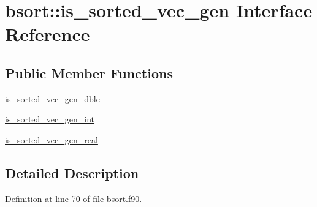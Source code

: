 \hypertarget{interfacebsort_1_1is__sorted__vec__gen}{\section{bsort\-:\-:is\-\_\-sorted\-\_\-vec\-\_\-gen Interface Reference}
\label{interfacebsort_1_1is__sorted__vec__gen}
}
\subsection*{Public Member Functions}
\begin{DoxyCompactItemize}
\item 
\hyperlink{interfacebsort_1_1is__sorted__vec__gen_ab6592b5dc057ec43ec5dc9ac77de307b_ab6592b5dc057ec43ec5dc9ac77de307b}{is\-\_\-sorted\-\_\-vec\-\_\-gen\-\_\-dble}
\item 
\hyperlink{interfacebsort_1_1is__sorted__vec__gen_a40e9d56cf837f3900453f01ee1ed17a8_a40e9d56cf837f3900453f01ee1ed17a8}{is\-\_\-sorted\-\_\-vec\-\_\-gen\-\_\-int}
\item 
\hyperlink{interfacebsort_1_1is__sorted__vec__gen_a8ff104afc751bc4ad89237f5da41960c_a8ff104afc751bc4ad89237f5da41960c}{is\-\_\-sorted\-\_\-vec\-\_\-gen\-\_\-real}
\end{DoxyCompactItemize}


\subsection{Detailed Description}


Definition at line 70 of file bsort.\-f90.



